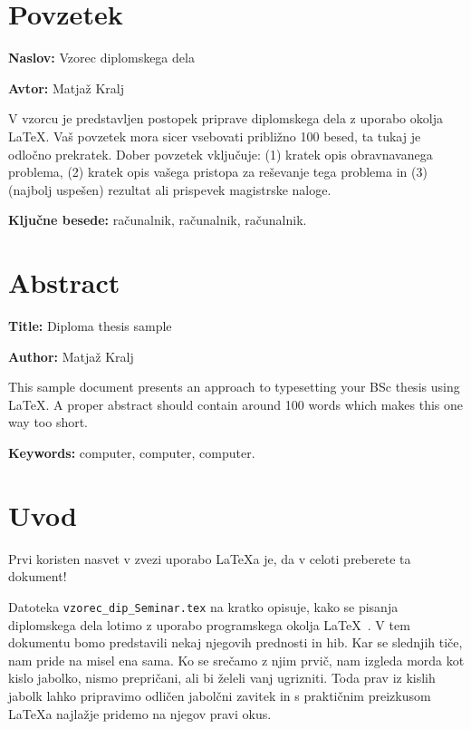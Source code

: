 \documentclass[a4paper, 12pt]{book}
\newcommand{\ttitle}{Vzorec diplomskega dela}
\newcommand{\ttitleEn}{Diploma thesis sample}
\newcommand{\tauthor}{Matjaž Kralj}
\newcommand{\tkeywords}{računalnik, računalnik, računalnik}
\newcommand{\tkeywordsEn}{computer, computer, computer}
\newcommand{\clearemptydoublepage}{\newpage{\pagestyle{empty}\cleardoublepage}}
\begin{document}
\clearemptydoublepage

\chapter*{Povzetek}

\noindent\textbf{Naslov:} \ttitle
\bigskip

\noindent\textbf{Avtor:} \tauthor
\bigskip

\noindent V vzorcu je predstavljen postopek priprave diplomskega dela z uporabo okolja \LaTeX. Vaš povzetek mora sicer vsebovati približno 100 besed, ta tukaj je odločno prekratek.
Dober povzetek vključuje: (1) kratek opis obravnavanega problema, (2) kratek opis vašega pristopa za reševanje tega problema in (3) (najbolj uspešen) rezultat ali prispevek magistrske naloge.

\bigskip

\noindent\textbf{Ključne besede:} \tkeywords.
\clearemptydoublepage

\chapter*{Abstract}

\noindent\textbf{Title:} \ttitleEn
\bigskip

\noindent\textbf{Author:} \tauthor
\bigskip

\noindent This sample document presents an approach to typesetting your BSc thesis using \LaTeX. 
A proper abstract should contain around 100 words which makes this one way too short.
\bigskip

\noindent\textbf{Keywords:} \tkeywordsEn.
\clearemptydoublepage

\mainmatter
\setcounter{page}{1}
\pagestyle{fancy}

\chapter{Uvod}
Prvi koristen nasvet v zvezi uporabo \LaTeX{a} je, da v celoti preberete ta dokument!

Datoteka {\tt vzorec\_dip\_Seminar.tex} na kratko opisuje, kako se pisanja diplomskega dela lotimo z uporabo programskega okolja \LaTeX~\cite{lamport,nenajkrajsi}. 
V tem dokumentu bomo predstavili nekaj njegovih prednosti in hib. 
Kar se slednjih tiče, nam pride na misel ena sama. 
Ko se srečamo z njim prvič, nam izgleda morda kot kislo jabolko, nismo prepričani, ali bi želeli vanj ugrizniti. 
Toda prav iz kislih jabolk lahko pripravimo odličen jabolčni zavitek in s praktičnim preizkusom \LaTeX a najlažje pridemo na njegov pravi okus.
\end{document}
